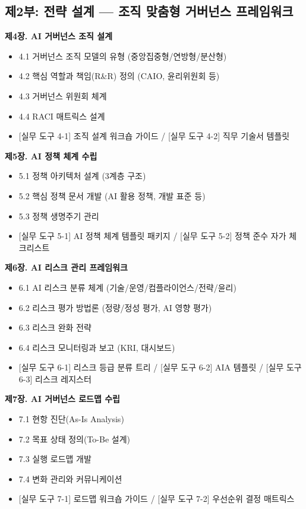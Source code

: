 \vspace{0.5cm}
\subsection*{제2부: 전략 설계 --- 조직 맞춤형 거버넌스 프레임워크}

\textbf{제4장. AI 거버넌스 조직 설계}
\begin{itemize}
 \item 4.1 거버넌스 조직 모델의 유형 (중앙집중형/연방형/분산형)
 \item 4.2 핵심 역할과 책임(R\&R) 정의 (CAIO, 윤리위원회 등)
 \item 4.3 거버넌스 위원회 체계
 \item 4.4 RACI 매트릭스 설계
 \item {[실무 도구 4-1] 조직 설계 워크숍 가이드} / {[실무 도구 4-2] 직무 기술서 템플릿}
\end{itemize}

\medskip
\textbf{제5장. AI 정책 체계 수립}
\begin{itemize}
 \item 5.1 정책 아키텍처 설계 (3계층 구조)
 \item 5.2 핵심 정책 문서 개발 (AI 활용 정책, 개발 표준 등)
 \item 5.3 정책 생명주기 관리
 \item {[실무 도구 5-1] AI 정책 체계 템플릿 패키지} / {[실무 도구 5-2] 정책 준수 자가 체크리스트}
\end{itemize}

\medskip
\textbf{제6장. AI 리스크 관리 프레임워크}
\begin{itemize}
 \item 6.1 AI 리스크 분류 체계 (기술/운영/컴플라이언스/전략/윤리)
 \item 6.2 리스크 평가 방법론 (정량/정성 평가, AI 영향 평가)
 \item 6.3 리스크 완화 전략
 \item 6.4 리스크 모니터링과 보고 (KRI, 대시보드)
 \item {[실무 도구 6-1] 리스크 등급 분류 트리} / {[실무 도구 6-2] AIA 템플릿} / {[실무 도구 6-3] 리스크 레지스터}
\end{itemize}

\medskip
\textbf{제7장. AI 거버넌스 로드맵 수립}
\begin{itemize}
 \item 7.1 현항 진단(As-Is Analysis)
 \item 7.2 목표 상태 정의(To-Be 설계)
 \item 7.3 실행 로드맵 개발
 \item 7.4 변화 관리와 커뮤니케이션
 \item {[실무 도구 7-1] 로드맵 워크숍 가이드} / {[실무 도구 7-2] 우선순위 결정 매트릭스}
\end{itemize}


